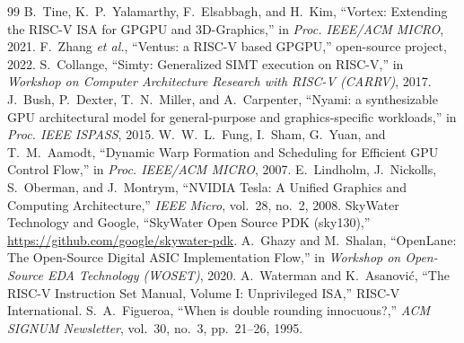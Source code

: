 \documentclass[conference]{IEEEtran}
\begin{document}
\begin{thebibliography}{99}
 B.~Tine, K.~P.~Yalamarthy, F.~Elsabbagh, and H.~Kim,
``Vortex: Extending the RISC-V ISA for GPGPU and 3D-Graphics,'' in
\emph{Proc. IEEE/ACM MICRO}, 2021.
 F.~Zhang \emph{et al.}, ``Ventus: a RISC-V based GPGPU,''
open-source project, 2022.
 S.~Collange, ``Simty: Generalized SIMT execution on RISC-V,''
in \emph{Workshop on Computer Architecture Research with RISC-V (CARRV)}, 2017.
 J.~Bush, P.~Dexter, T.~N.~Miller, and A.~Carpenter,
``Nyami: a synthesizable GPU architectural model for general-purpose and
graphics-specific workloads,'' in \emph{Proc. IEEE ISPASS}, 2015.
 W.~W.~L.~Fung, I.~Sham, G.~Yuan, and T.~M.~Aamodt,
``Dynamic Warp Formation and Scheduling for Efficient GPU Control Flow,'' in
\emph{Proc. IEEE/ACM MICRO}, 2007.
 E.~Lindholm, J.~Nickolls, S.~Oberman, and J.~Montrym,
``NVIDIA Tesla: A Unified Graphics and Computing Architecture,''
\emph{IEEE Micro}, vol.~28, no.~2, 2008.
 SkyWater Technology and Google, ``SkyWater Open Source PDK
(sky130),'' \url{https://github.com/google/skywater-pdk}.
 A.~Ghazy and M.~Shalan, ``OpenLane: The Open-Source Digital
ASIC Implementation Flow,'' in \emph{Workshop on Open-Source EDA Technology
(WOSET)}, 2020.
 A.~Waterman and K.~Asanovi\'c, ``The RISC-V Instruction Set
Manual, Volume I: Unprivileged ISA,'' RISC-V International.
 S.~A.~Figueroa, ``When is double rounding innocuous?,''
\emph{ACM SIGNUM Newsletter}, vol.~30, no.~3, pp.~21--26, 1995.
\end{thebibliography}
\end{document}
